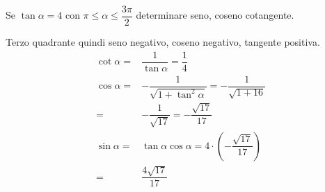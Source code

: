 	
	Se $\tan\alpha=4$ con $\pi\leq\alpha\leq\dfrac{3\pi}{2}$ determinare seno, coseno cotangente.
	
Terzo quadrante quindi seno negativo, coseno negativo, tangente positiva.
\begin{align*}
\cot\alpha=&\dfrac{1}{\tan\alpha}=\dfrac{1}{4}\\
\cos\alpha=&-\dfrac{1}{\sqrt{1+\tan^2\alpha}}=-\dfrac{1}{\sqrt{1+16}}\\
=&-\dfrac{1}{\sqrt{17}}=-\dfrac{\sqrt{17}}{17}\\
\sin\alpha=&\tan\alpha\cos\alpha=4\cdot\left(-\dfrac{\sqrt{17}}{17}\right)\\
=&\dfrac{4\sqrt{17}}{17}
\end{align*}
